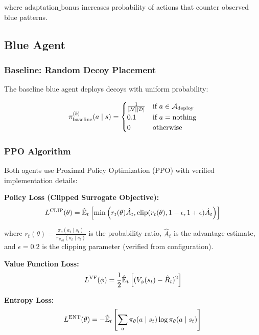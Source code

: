 \documentclass[12pt,twoside]{article}
\theoremstyle{definition}
\theoremstyle{plain}
\begin{document}
where $\text{adaptation\_bonus}$ increases probability of actions that counter observed blue patterns.

\subsection{Blue Agent}

\subsubsection{Baseline: Random Decoy Placement}
The baseline blue agent deploys decoys with uniform probability:

\begin{equation}
\pi^{(b)}_{\text{baseline}}(a \mid s) = \begin{cases}
\frac{1}{|\mathcal{N}||\mathcal{D}|} & \text{if } a \in \mathcal{A}_{\text{deploy}} \\
0.1 & \text{if } a = \text{nothing} \\
0 & \text{otherwise}
\end{cases}
\end{equation}

\subsubsection{PPO Algorithm}

Both agents use Proximal Policy Optimization (PPO) with verified implementation details:

\textbf{Policy Loss (Clipped Surrogate Objective):}
\begin{equation}
L^{\text{CLIP}}(\theta) = \hat{\mathbb{E}}_t\left[\min\left(r_t(\theta)\hat{A}_t, \text{clip}(r_t(\theta), 1-\epsilon, 1+\epsilon)\hat{A}_t\right)\right]
\end{equation}

where $r_t(\theta) = \frac{\pi_\theta(a_t \mid s_t)}{\pi_{\theta_{\text{old}}}(a_t \mid s_t)}$ is the probability ratio, $\hat{A}_t$ is the advantage estimate, and $\epsilon = 0.2$ is the clipping parameter (verified from configuration).

\textbf{Value Function Loss:}
\begin{equation}
L^{\text{VF}}(\phi) = \frac{1}{2}\hat{\mathbb{E}}_t\left[(V_\phi(s_t) - \hat{R}_t)^2\right]
\end{equation}

\textbf{Entropy Loss:}
\begin{equation}
L^{\text{ENT}}(\theta) = -\hat{\mathbb{E}}_t\left[\sum_a \pi_\theta(a \mid s_t) \log \pi_\theta(a \mid s_t)\right]
\end{equation}
\end{document}
